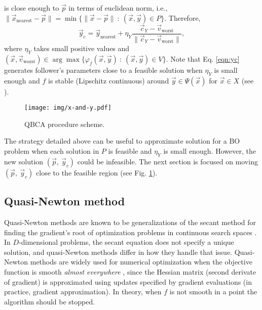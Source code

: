 \documentclass[conference]{IEEEtran}
\theoremstyle{definition}
\begin{document}
is close enough to $\vec{p}$ in terms of euclidean norm, i.e.,
$ \| \vec{x}_{\text{nearest}} - \vec{p} \| = \min\{ \| \vec{x} - \vec{p} \| \ : \ (\vec{x}, \vec{y}) \in P  \} $.
Therefore,
% 
\begin{equation}
    \vec{y}_c = \vec{y}_{\text{nearest}} + \eta_{Y} \dfrac{\vec{c}_Y - \vec{v}_{\text{worst}}}{\| \vec{c}_Y - \vec{v}_{\text{worst}} \|},
    \label{eqn:yc}
\end{equation} %
% 
where $\eta_Y$ takes small positive values and 
% 
$
    (\vec{x}, \vec{v}_{\text{worst}}) \in \arg \max \{\varphi_f(\vec{x}, \vec{y} )  \ : \ (\vec{x}, \vec{y}) \in V \}
$. Note that Eq. \ref{eqn:yc} generates follower's parameters close to a feasible
solution when $\eta_{Y}$ is small enough and $f$ is stable (Lipschitz continuous)
around $\vec{y} \in \Psi(\vec{x}) $ for  $\vec{x} \in X$ (see \cite{dempe2002foundations}). %
% 

% 
\begin{figure}[t]
    \centering
    \texttt{[image: img/x-and-y.pdf]}
    \caption{QBCA procedure scheme.}
    \label{fig:qca}
\end{figure}
% 
The strategy detailed above can be useful to approximate solution for a BO problem
when each solution in  $P$ is feasible and $\eta_{Y}$ is small enough. However,
the new solution $(\vec{p},\ \vec{y}_c)$ could be infeasible. The next section
is focused on moving $(\vec{p},\ \vec{y}_c)$ close to the feasible region
(see Fig. \ref{fig:qca}).


\subsection{Quasi-Newton method} %
\label{sub:nonsmooth_optimization_via_bfgs}

Quasi-Newton methods are known to be generalizations of the secant method for
finding the gradient's root of optimization problems in continuous search spaces \cite{fletcher2013practical,liu1989limited}.
In $D$-dimensional problems, the secant equation does not specify a unique solution,
and quasi-Newton methods differ in how they handle that issue. Quasi-Newton methods
are widely used for numerical optimization when the objective function is smooth
\textit{almost everywhere} \cite{lewis2013nonsmooth}, since the Hessian matrix
(second derivate of gradient) is approximated using updates specified by gradient
evaluations (in practice, gradient approximation). In theory, when $f$ is not
smooth in a point the algorithm should be stopped. 
\end{document}
